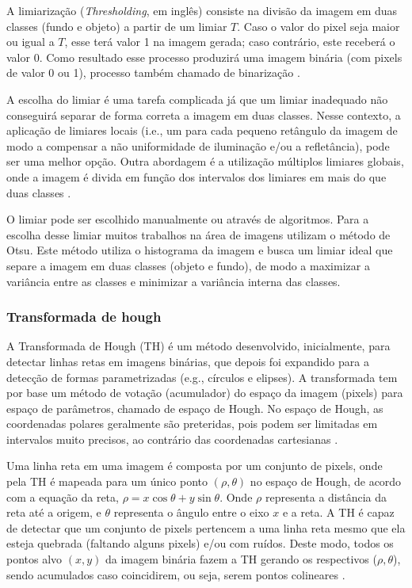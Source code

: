 \documentclass[12pt, a4paper, english, brazil]{article}
\begin{document}
A limiarização (\textit{Thresholding}, em inglês) consiste na divisão da imagem em duas classes (fundo e objeto) a partir de um limiar $T$. Caso o valor do pixel seja maior ou igual a $T$, esse terá valor 1 na imagem gerada; caso contrário, este receberá o valor 0. Como resultado esse processo produzirá uma imagem binária (com pixels de valor 0 ou 1), processo também chamado de binarização \cite{Marques_Filho_1999}.

A escolha do limiar é uma tarefa complicada já que um limiar inadequado não conseguirá separar de forma correta a imagem em duas classes. Nesse contexto, a aplicação de limiares locais (i.e., um para cada pequeno retângulo da imagem de modo a compensar a não uniformidade de iluminação e/ou a refletância), pode ser uma melhor opção. Outra abordagem é a utilização múltiplos limiares globais, onde a imagem é divida em função dos intervalos dos limiares em mais do que duas classes \cite{Gonzalez_Woods_2010}.

O limiar pode ser escolhido manualmente ou através de algoritmos. Para a escolha desse limiar muitos trabalhos na área de imagens utilizam o método de Otsu. Este método \cite{Otsu_1979} utiliza o histograma da imagem e busca um limiar ideal que separe a imagem em duas classes (objeto e fundo), de modo a maximizar a variância entre as classes e minimizar a variância interna das classes.

\subsubsection{Transformada de hough}

A Transformada de Hough (TH) é um método desenvolvido, inicialmente, para detectar linhas retas em imagens binárias, que depois foi expandido para a detecção de formas parametrizadas (e.g., círculos e elipses). A transformada tem por base um método de votação (acumulador) do espaço da imagem (pixels) para espaço de parâmetros, chamado de espaço de Hough. No espaço de Hough, as coordenadas polares geralmente são preteridas, pois podem ser limitadas em intervalos muito precisos, ao contrário das coordenadas cartesianas \cite{Bah_2020}.

Uma linha reta em uma imagem é composta por um conjunto de pixels, onde pela TH é mapeada para um único ponto $(\rho, \theta)$ no espaço de Hough, de acordo com a equação da reta, $\rho = x \cos \theta + y \sin \theta$. Onde $\rho$ representa a distância da reta até a origem, e $\theta$ representa o ângulo entre o eixo $x$ e a reta. A TH é capaz de detectar que um conjunto de pixels pertencem a uma linha reta mesmo que ela esteja quebrada (faltando alguns pixels) e/ou com ruídos. Deste modo, todos os pontos alvo $(x, y)$ da imagem binária fazem a TH gerando os respectivos ($\rho, \theta$), sendo acumulados caso coincidirem, ou seja, serem pontos colineares \cite{Huiying_2015}.
\end{document}
